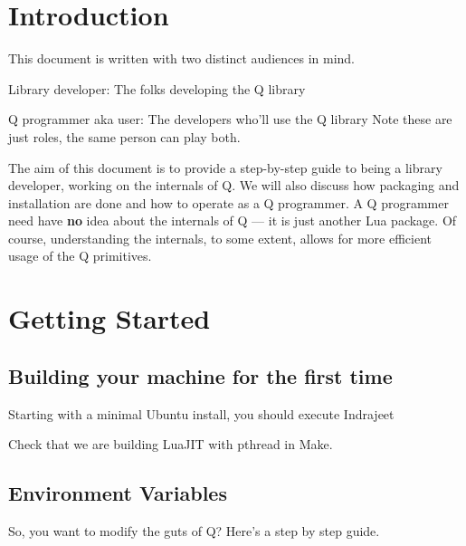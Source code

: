 
\section{Introduction}

This document is written with two distinct audiences in mind.
\be
\item Library developer: The folks developing the Q library 
\item Q programmer aka user: The developers who'll use the Q library
\ee
Note these are just roles, the same person can play both.

The aim of this document is to provide a step-by-step guide to being a
library developer, working on the internals of Q. We will also
discuss how packaging and installation are done and how to operate as
a Q programmer. A Q programmer need have {\bf no} idea about the
internals of Q --- it is just another Lua package. Of course,
understanding the internals, to some extent, allows for more efficient
usage of the Q primitives.


\section{Getting Started}
\label{getting_started}

\subsection{Building your machine for the first time}

Starting with a minimal Ubuntu install, you should execute Indrajeet \TBC

Check that we are building LuaJIT with pthread in Make. \TBC



\subsection{Environment Variables}
\label{env_var}
So, you want to modify the guts of Q? Here's a step by step guide.

